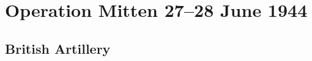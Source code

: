 \documentclass[noraggedright]{turabian-researchpaper}
\begin{document}



\section{Operation Mitten 27--28 June 1944}







	\subsection{British Artillery} %
\end{document}
